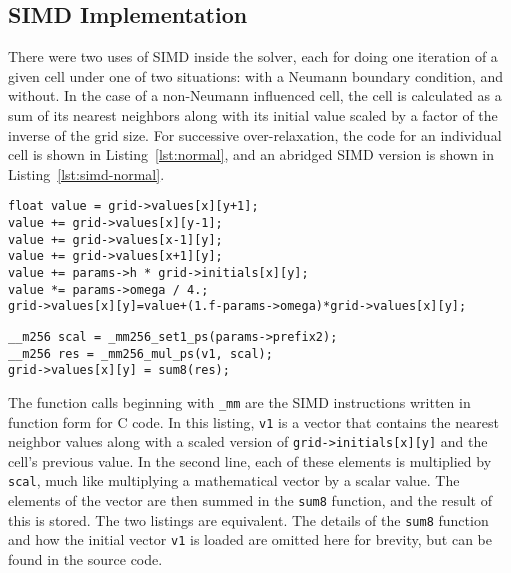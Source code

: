 \subsection{SIMD Implementation}
There were two uses of SIMD inside the solver, each for doing one iteration of a given cell under one of two situations: with a Neumann boundary condition, and
without. In the case of a non-Neumann influenced cell, the cell is calculated as a sum of its nearest neighbors along with its initial value scaled by a
factor of the inverse of the grid size. For successive over-relaxation, the code for an individual cell is shown in Listing~\ref{lst:normal}, and an abridged
SIMD version is shown in Listing~\ref{lst:simd-normal}.

\vspace{5mm}

\begin{minipage}{\linewidth}
	\begin{lstlisting}[frame=single,label=lst:normal,caption={[Iteration code for a signle cell.]Iteration code (simplified) for a single cell. Also notice that this code uses structure-of-arrays data layout.}]
float value = grid->values[x][y+1];
value += grid->values[x][y-1];
value += grid->values[x-1][y];
value += grid->values[x+1][y];
value += params->h * grid->initials[x][y];
value *= params->omega / 4.;
grid->values[x][y]=value+(1.f-params->omega)*grid->values[x][y];
\end{lstlisting}
\end{minipage}

\begin{minipage}{\linewidth}
	\begin{lstlisting}[frame=single,label=lst:simd-normal,caption={[SIMD version of iteration code for a single cell.]SIMD version of iteration code for a single cell. The loading of the initial vector is not shown for simplicity.}]
__m256 scal = _mm256_set1_ps(params->prefix2);
__m256 res = _mm256_mul_ps(v1, scal);
grid->values[x][y] = sum8(res);
\end{lstlisting}
\end{minipage}

The function calls beginning with \texttt{\_mm} are the SIMD instructions written in function form for C code. In this listing, \texttt{v1} is a vector that contains
the nearest neighbor values along with a scaled version of \texttt{grid->initials[x][y]} and the cell's previous value. In the second line, each of these elements is
multiplied by \texttt{scal}, much like multiplying a mathematical vector by a scalar value. The elements of the vector are then summed in the \texttt{sum8} function,
and the result of this is stored. The two listings are equivalent. The details of the \texttt{sum8} function and how the initial vector \texttt{v1} is loaded are
omitted here for brevity, but can be found in the source code.

